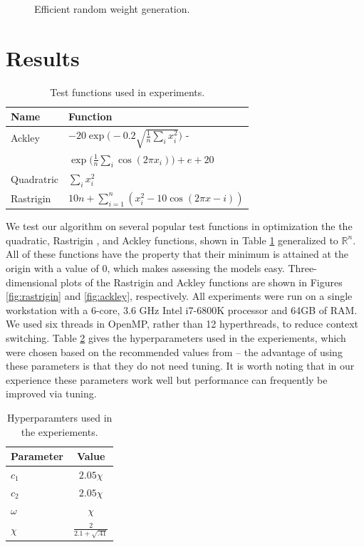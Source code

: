 \begin{figure}
  
  \caption{Efficient random weight generation.}\label{fig:efficient-par}
\end{figure}

\section{Results}\label{sec:results}
\begin{table}
  \centering
  \caption{Test functions used in experiments.}\label{tab:functions}
  \begin{tabular}{ll}\toprule
    \textbf{Name} & \textbf{Function}\\\midrule
    Ackley & $-20\exp\Big(-0.2\sqrt{\frac{1}{n}\sum_ix_i^2}\Big)$ -\\
    & \hspace{5mm} $\exp\Big(\frac{1}{n}\sum_i\cos(2\pi x_i)\Big) + e + 20$\\
    Quadratric & $\sum_i x_i^2$\\
    Rastrigin & $10n + \sum_{i=1}^n(x_i^2 - 10\cos(2\pi x - i))$\\\bottomrule
  \end{tabular}
\end{table}
We test our algorithm on several popular test functions in optimization
\cite{testprobs} the the quadratic, Rastrigin
\cite{rastrigin}, and Ackley \cite{ackley} functions, shown in Table
\ref{tab:functions} generalized to $\mathbb{R}^n$. All of these functions have
the property that their minimum is attained at the origin with a value of
$0$, which makes assessing the models easy. Three-dimensional plots of the
Rastrigin and Ackley functions are shown in Figures \ref{fig:rastrigin} and
\ref{fig:ackley}, respectively.
All experiments were run on a single
workstation with a 6-core, 3.6 GHz Intel i7-6800K processor and 64GB of RAM. We
used six threads in OpenMP, rather than 12 hyperthreads, to reduce context switching.
Table \ref{tab:param}
gives the hyperparameters used in the experiements, which were chosen based on
the recommended values from \cite{pso-convergence, spso} -- the advantage of
using these parameters is that they do not need tuning. It is
worth noting that in our experience these parameters work well but performance
can frequently be improved via tuning.

\begin{table}
  \centering
  \caption{Hyperparamters used in the experiements.}\label{tab:param}
  \begin{tabular}{lc}\toprule
    \textbf{Parameter} & \textbf{Value}\\\midrule
    $c_1$ & $2.05 \chi$\\
    $c_2$ & $2.05 \chi$\\
    $\omega$ & $\chi$\\
    $\chi$ & $\frac{2}{2.1 + \sqrt{.41}}$\\\bottomrule
    \end{tabular}
\end{table}

